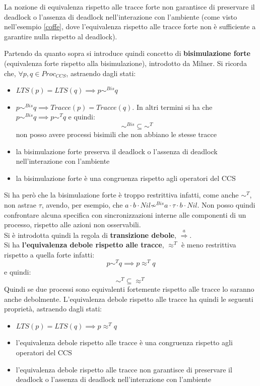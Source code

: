 \documentclass[a4paper,12pt, oneside]{book}
\begin{document}
\begin{teorema}
  La nozione di equivalenza rispetto alle tracce forte non garantisce di
  preservare il deadlock o l'assenza di deadlock nell'interazione con l'ambiente
  (come visto nell'esempio \ref{coffe}, dove l'equivalenza rispetto alle tracce
  forte non è sufficiente a garantire nulla rispetto al deadlock).
\end{teorema}
Partendo da quanto sopra si introduce quindi concetto di \textbf{bisimulazione
  forte} (equivalenza forte rispetto alla bisimulazione), introdotto da
Milner. Si ricorda che, $\forall p,q\in Proc_{CCS}$, 
astraendo dagli stati:
\begin{itemize}
  \item $LTS(p)=LTS(q)\implies p\sim^{Bis}q$
  
  \item $p\sim^{Bis}q\implies Tracce(p)=Tracce(q)$. In altri termini si ha che
  $p\sim^{Bis}q\implies p\sim^T q$ e quindi:
  \[\sim^{Bis}\subseteq \sim^T\]
  non posso avere processi bisimili che non abbiano le stesse tracce
  \item la bisimulazione forte preserva il deadlock o l'assenza di deadlock
  nell'interazione con l'ambiente
  \item la bisimulazione forte è una congruenza rispetto agli operatori del CCS
\end{itemize}
Si ha però che la bisimulazione forte è troppo restrittiva infatti, come anche
$\sim^T$, non astrae $\tau$, avendo, per esempio, che $a\cdot b\cdot
Nil\not\sim^{Bis} a\cdot \tau\cdot b\cdot Nil$. Non posso quindi confrontare
alcuna specifica con sincronizzazioni interne alle componenti di un processo,
rispetto alle azioni non osservabili.\\ 
Si è introdotta quindi la regola di \textbf{transizione debole},
$\stackrel{a}{\Rightarrow}$.\\ 
Si ha \textbf{l'equivalenza debole rispetto alle tracce}, $\approx^T$ è meno
restrittiva rispetto a quella forte infatti:
\[p\sim^T q\implies p\approx^T q\]
e quindi:
\[\sim^T \subseteq \approx^T\]
Quindi se due processi sono equivalenti fortemente rispetto alle tracce lo
saranno anche debolmente. L'equivalenza debole rispetto alle tracce ha quindi le
seguenti proprietà, astraendo dagli stati:
\begin{itemize}
  \item $LTS(p)=LTS(q)\implies p\approx^{T}q$
  \item l'equivalenza debole rispetto alle tracce è una congruenza rispetto
  agli operatori del CCS 
  \item l'equivalenza debole rispetto alle tracce non garantisce di
  preservare il deadlock o l'assenza di deadlock nell'interazione con l'ambiente
\end{itemize}
\end{document}
